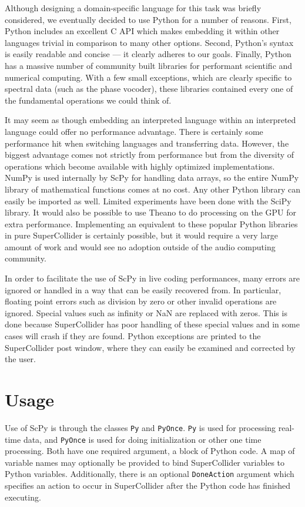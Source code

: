 \documentclass{article}
\begin{document}
Although designing a domain-specific language for this task was briefly considered, we eventually
decided to use Python for a number of reasons. First, Python includes an excellent C API which
makes embedding it within other languages trivial in comparison to many other options. Second,
Python's syntax is easily readable and concise --- it clearly adheres to our goals. Finally, Python
has a massive number of community built libraries for performant scientific and numerical
computing. With a few small exceptions, which are clearly specific to spectral data (such as the
phase vocoder), these libraries contained every one of the fundamental operations we could think
of.

It may seem as though embedding an interpreted language within an interpreted language could offer
no performance advantage. There is certainly some performance hit when switching languages and
transferring data. However, the biggest advantage comes not strictly from performance but from the
diversity of operations which become available with highly optimized implementations. NumPy is used
internally by ScPy for handling data arrays, so the entire NumPy library of mathematical functions
comes at no cost. Any other Python library can easily be imported as well. Limited experiments
have been done with the SciPy library. It would also be possible to use Theano to do processing on
the GPU for extra performance. Implementing an equivalent to these popular Python libraries in pure
SuperCollider is certainly possible, but it would require a very large amount of work and would see
no adoption outside of the audio computing community.

In order to facilitate the use of ScPy in live coding performances, many errors are ignored or
handled in a way that can be easily recovered from. In particular, floating point errors such as
division by zero or other invalid operations are ignored. Special values such as infinity or NaN
are replaced with zeros. This is done because SuperCollider has poor handling of these special
values and in some cases will crash if they are found. Python exceptions are printed to the
SuperCollider post window, where they can easily be examined and corrected by the user.

\section{Usage}\label{sec:usage}

Use of ScPy is through the classes \texttt{Py} and \texttt{PyOnce}. \texttt{Py} is used for
processing real-time data, and \texttt{PyOnce} is used for doing initialization or other one time
processing. Both have one required argument, a block of Python code. A map of variable names may
optionally be provided to bind SuperCollider variables to Python variables. Additionally, there is
an optional \texttt{DoneAction} argument which specifies an action to occur in SuperCollider after
the Python code has finished executing.
\end{document}
